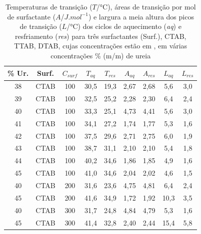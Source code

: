         \begin{table}[h]
            \IBGEtab%
            {\caption{Temperaturas de transição ($T$/°C), áreas de transição por mol de surfactante ($A$/$J.mol^{-1}$) e largura a meia altura dos picos de transição ($L$/°C) dos ciclos de aquecimento (\emph{aq}) e resfriamento (\emph{res}) para três surfactantes (Surf.), CTAB, TTAB, DTAB, cujas concentrações estão em \mM, em várias concentrações \% (m/m) de ureia}
            \label{tab:DSC_temp_areas}}%
            {\begin{tabular}{ccccccccc}
                \toprule
    			\% Ur. & Surf. & $C_{surf}$ & $T_{aq}$ & $T_{res}$ & $A_{aq}$ & $A_{res}$ & $L_{aq}$ & $L_{res}$ \\
    			\midrule
    			38     & CTAB  & 100        & 30,5     & 19,3      & 2,67     & 2,68      & 5,6      & 	3,0      \\
    			39     & CTAB  & 100        & 32,5     & 25,2      & 2,28     & 2,30      & 6,4      & 	2,4      \\
    			40     & CTAB  & 100        & 33,3     & 25,1      & 4,73     & 4,41      & 5,6      & 	3,0      \\
    			41     & CTAB  & 100        & 34,1     & 27,2      & 1,74     & 1,77      & 5,3      & 	1,6      \\
    			42     & CTAB  & 100        & 37,5     & 29,6      & 2,71     & 2,75      & 6,0      & 	1,9      \\
    			43     & CTAB  & 100        & 38,7     & 31,1      & 2,10     & 2,10      & 5,4      & 	1,8      \\
    			44     & CTAB  & 100        & 40,2     & 34,6      & 1,86     & 1,85      & 4,9      & 	1,6      \\
    			45     & CTAB  & 100        & 41,0     & 34,6      & 2,04     & 2,02      & 4,6      & 	1,5      \\
    			\midrule
    			40     & CTAB  & 200        & 31,6     & 23,6      & 4,75     & 4,81      & 6,4      & 	2,4      \\
    			45     & CTAB  & 200        & 41,6     & 34,9      & 1,72     & 1,92      & 10,3     & 3,5       \\
    			40     & CTAB  & 300        & 31,7     & 24,8      & 4,84     & 4,79      & 5,3      & 	1,6      \\
    			45     & CTAB  & 300        & 41,4     & 32,8      & 2,40     & 2,44      & 15,4     & 5,8       \\

\end{tabular}}
\end{table}
